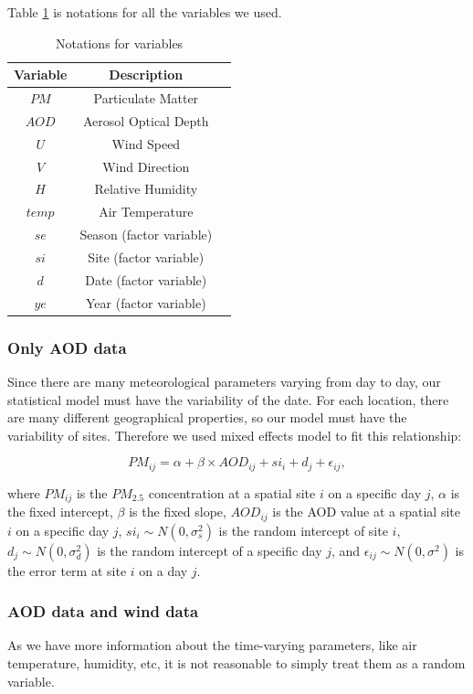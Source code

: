 \documentclass[10pt]{article}
\begin{document}
Table \ref{variable} is notations for all the variables we used. 

\begin{table}[H] 
\centering
\begin{tabular}{|c|c|c|}
\hline
Variable & Description \\ 
\hline
$PM$ & Particulate Matter \\
$AOD$ & Aerosol Optical Depth \\
$U$ & Wind Speed \\
$V$ & Wind Direction \\
$H$ & Relative Humidity \\
$temp$ & Air Temperature \\
$se$ & Season (factor variable)\\
$si$ & Site (factor variable)\\
$d$ & Date (factor variable)\\
$ye$ & Year (factor variable)\\
\hline
\end{tabular}
\caption{Notations for variables}
\label{variable}
\end{table}

\subsubsection{Only AOD data}
Since there are many meteorological parameters varying from day to day, our statistical model must have the variability of the date. For each location, there are many different geographical properties, so our model must have the variability of sites. Therefore we used mixed effects model to fit this relationship:

$$PM_{ij} = \alpha + \beta\times AOD_{ij} + si_i + d_j+ \epsilon_{ij}, $$

where $PM_{ij}$ is the $PM_{2.5}$ concentration at a spatial site $i$ on a specific day $j$, $\alpha$ is the fixed intercept, $\beta$ is the fixed slope, $AOD_{ij}$ is the AOD value at a spatial site $i$ on a specific day $j$, $si_i\sim N(0, \sigma_s^2)$ is the random intercept of site $i$, $d_j\sim N(0, \sigma_d^2)$ is the random intercept of a specific day $j$, and $\epsilon_{ij}\sim N(0, \sigma^2)$ is the error term at site $i$ on a day $j$.

\subsubsection{AOD data and wind data}
As we have more information about the time-varying parameters, like air temperature, humidity, etc, it is not reasonable to simply treat them as a random variable. 
\end{document}
